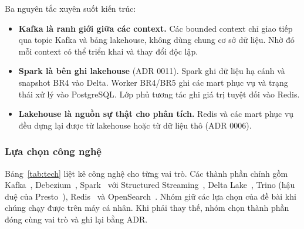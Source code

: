 Ba nguyên tắc xuyên suốt kiến trúc:
\begin{itemize}
  \item \textbf{Kafka là ranh giới giữa các context.} Các bounded context chỉ giao tiếp qua topic Kafka và bảng lakehouse, không dùng chung cơ sở dữ liệu. Nhờ đó mỗi context có thể triển khai và thay đổi độc lập.
  \item \textbf{Spark là bên ghi lakehouse} (ADR 0011). Spark ghi dữ liệu hạ cánh và snapshot BR4 vào Delta. Worker BR4/BR5 ghi các mart phục vụ và trạng thái xử lý vào PostgreSQL. Lớp phủ tương tác ghi giá trị tuyệt đối vào Redis.
  \item \textbf{Lakehouse là nguồn sự thật cho phân tích.} Redis và các mart phục vụ đều dựng lại được từ lakehouse hoặc từ dữ liệu thô (ADR 0006).
\end{itemize}

\subsubsection{Lựa chọn công nghệ}

Bảng~\ref{tab:tech} liệt kê công nghệ cho từng vai trò. Các thành phần chính gồm Kafka~\cite{kreps2011kafka}, Debezium~\cite{debezium}, Spark~\cite{zaharia2016spark} với Structured Streaming~\cite{armbrust2018structured}, Delta Lake~\cite{armbrust2020delta}, Trino (hậu duệ của Presto~\cite{sethi2019presto}), Redis~\cite{redis} và OpenSearch~\cite{opensearch}. Nhóm giữ các lựa chọn của đề bài khi chúng chạy được trên máy cá nhân. Khi phải thay thế, nhóm chọn thành phần đóng cùng vai trò và ghi lại bằng ADR.

